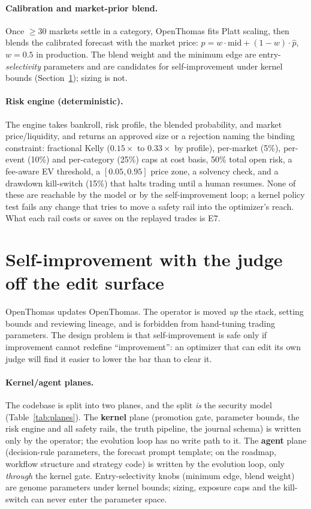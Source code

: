 \documentclass[sigconf,review,anonymous]{acmart}
\begin{document}
\paragraph{Calibration and market-prior blend.}
Once $\geq 30$ markets settle in a category, OpenThomas fits Platt scaling, then
blends the calibrated forecast with the market price:
$p = w\cdot\text{mid} + (1-w)\cdot\hat p$, $w = 0.5$ in production. The blend
weight and the minimum edge are entry-\emph{selectivity} parameters and are
candidates for self-improvement under kernel bounds (Section~\ref{sec:rsi});
sizing is not.

\paragraph{Risk engine (deterministic).}
The engine takes bankroll, risk profile, the blended probability, and market
price/liquidity, and returns an approved size or a rejection naming the binding
constraint: fractional Kelly ($0.15\times$ to $0.33\times$ by profile),
per-market (5\%), per-event (10\%) and per-category (25\%) caps at cost basis,
50\% total open risk, a fee-aware EV threshold, a $[0.05, 0.95]$ price zone, a
solvency check, and a drawdown kill-switch (15\%) that halts trading until a
human resumes. None of these are reachable by the model or by the
self-improvement loop; a kernel policy test fails any change that tries to
move a safety rail into the optimizer's reach. What each rail costs or saves
on the replayed trades is E7.

\section{Self-improvement with the judge off the edit surface}
\label{sec:rsi}

OpenThomas updates OpenThomas. The operator is moved \emph{up} the stack, setting
bounds and reviewing lineage, and is forbidden from hand-tuning trading
parameters. The design problem is that self-improvement is safe only if
improvement cannot redefine ``improvement'': an optimizer that can edit its own
judge will find it easier to lower the bar than to clear it.

\paragraph{Kernel/agent planes.} The codebase is split into two planes, and the
split \emph{is} the security model (Table~\ref{tab:planes}). The \textbf{kernel}
plane (promotion gate, parameter bounds, the risk engine and all safety rails,
the truth pipeline, the journal schema) is written only by the operator; the
evolution loop has no write path to it. The \textbf{agent} plane
(decision-rule parameters, the forecast prompt template; on the roadmap,
workflow structure and strategy code) is written by the evolution loop, only
\emph{through} the kernel gate. Entry-selectivity knobs (minimum edge, blend
weight) are genome parameters under kernel bounds; sizing, exposure caps and
the kill-switch can never enter the parameter space.
\end{document}
